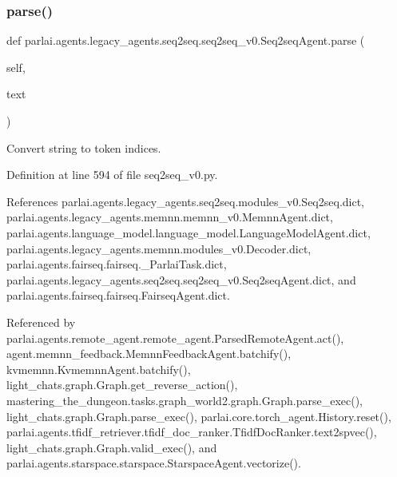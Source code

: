 \subsubsection{\texorpdfstring{parse()}{parse()}}
{\footnotesize\ttfamily def parlai.\+agents.\+legacy\+\_\+agents.\+seq2seq.\+seq2seq\+\_\+v0.\+Seq2seq\+Agent.\+parse (\begin{DoxyParamCaption}\item[{}]{self,  }\item[{}]{text }\end{DoxyParamCaption})}

\begin{DoxyVerb}Convert string to token indices.\end{DoxyVerb}
 

Definition at line 594 of file seq2seq\+\_\+v0.\+py.



References parlai.\+agents.\+legacy\+\_\+agents.\+seq2seq.\+modules\+\_\+v0.\+Seq2seq.\+dict, parlai.\+agents.\+legacy\+\_\+agents.\+memnn.\+memnn\+\_\+v0.\+Memnn\+Agent.\+dict, parlai.\+agents.\+language\+\_\+model.\+language\+\_\+model.\+Language\+Model\+Agent.\+dict, parlai.\+agents.\+legacy\+\_\+agents.\+memnn.\+modules\+\_\+v0.\+Decoder.\+dict, parlai.\+agents.\+fairseq.\+fairseq.\+\_\+\+Parlai\+Task.\+dict, parlai.\+agents.\+legacy\+\_\+agents.\+seq2seq.\+seq2seq\+\_\+v0.\+Seq2seq\+Agent.\+dict, and parlai.\+agents.\+fairseq.\+fairseq.\+Fairseq\+Agent.\+dict.



Referenced by parlai.\+agents.\+remote\+\_\+agent.\+remote\+\_\+agent.\+Parsed\+Remote\+Agent.\+act(), agent.\+memnn\+\_\+feedback.\+Memnn\+Feedback\+Agent.\+batchify(), kvmemnn.\+Kvmemnn\+Agent.\+batchify(), light\+\_\+chats.\+graph.\+Graph.\+get\+\_\+reverse\+\_\+action(), mastering\+\_\+the\+\_\+dungeon.\+tasks.\+graph\+\_\+world2.\+graph.\+Graph.\+parse\+\_\+exec(), light\+\_\+chats.\+graph.\+Graph.\+parse\+\_\+exec(), parlai.\+core.\+torch\+\_\+agent.\+History.\+reset(), parlai.\+agents.\+tfidf\+\_\+retriever.\+tfidf\+\_\+doc\+\_\+ranker.\+Tfidf\+Doc\+Ranker.\+text2spvec(), light\+\_\+chats.\+graph.\+Graph.\+valid\+\_\+exec(), and parlai.\+agents.\+starspace.\+starspace.\+Starspace\+Agent.\+vectorize().

